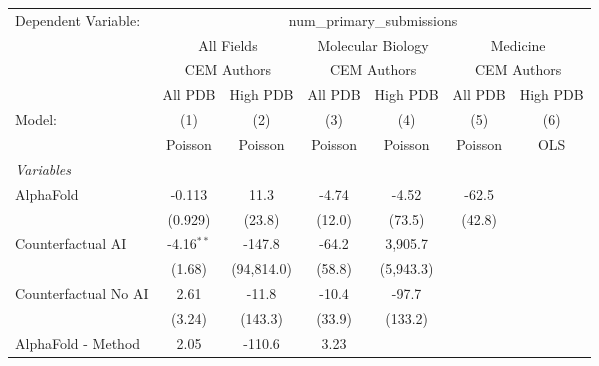 \begingroup
\centering
\begin{tabular}{lcccccc}
   \tabularnewline \midrule \midrule
   Dependent Variable: & \multicolumn{6}{c}{num\_primary\_submissions}\\
 & \multicolumn{2}{c}{All Fields} & \multicolumn{2}{c}{Molecular Biology} & \multicolumn{2}{c}{Medicine} \\
\cmidrule(lr){2-3} \cmidrule(lr){4-5} \cmidrule(lr){6-7}
 & \multicolumn{2}{c}{CEM Authors} & \multicolumn{2}{c}{CEM Authors} & \multicolumn{2}{c}{CEM Authors} \\
\cmidrule(lr){2-3} \cmidrule(lr){4-5} \cmidrule(lr){6-7}
 & \multicolumn{1}{c}{All PDB} & \multicolumn{1}{c}{High PDB} & \multicolumn{1}{c}{All PDB} & \multicolumn{1}{c}{High PDB} & \multicolumn{1}{c}{All PDB} & \multicolumn{1}{c}{High PDB} \\
\cmidrule(lr){2-2} \cmidrule(lr){3-3} \cmidrule(lr){4-4} \cmidrule(lr){5-5} \cmidrule(lr){6-6} \cmidrule(lr){7-7}
   Model:                                                     & (1)          & (2)        & (3)       & (4)       & (5)     & (6)\\  
                                                              &  Poisson     & Poisson    & Poisson   & Poisson   & Poisson & OLS\\  
   \midrule
   \emph{Variables}\\
   AlphaFold                                                  & -0.113       & 11.3       & -4.74     & -4.52     & -62.5   &   \\   
                                                              & (0.929)      & (23.8)     & (12.0)    & (73.5)    & (42.8)  &   \\   
   Counterfactual AI                                          & -4.16$^{**}$ & -147.8     & -64.2     & 3,905.7   &         &   \\   
                                                              & (1.68)       & (94,814.0) & (58.8)    & (5,943.3) &         &   \\   
   Counterfactual No AI                                       & 2.61         & -11.8      & -10.4     & -97.7     &         &   \\   
                                                              & (3.24)       & (143.3)    & (33.9)    & (133.2)   &         &   \\   
   AlphaFold - Method                                         & 2.05         & -110.6     & 3.23      &           &         &   \\   

\end{tabular}
